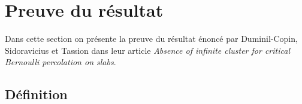 
\chapter{Preuve du résultat}
	Dans cette section on présente la preuve du résultat énoncé par Duminil-Copin, Sidoravicius et Tassion dans leur article \emph{Absence of infinite cluster for critical Bernoulli percolation on slabs}.
	\section{Définition}
	
	
\Tbreak
